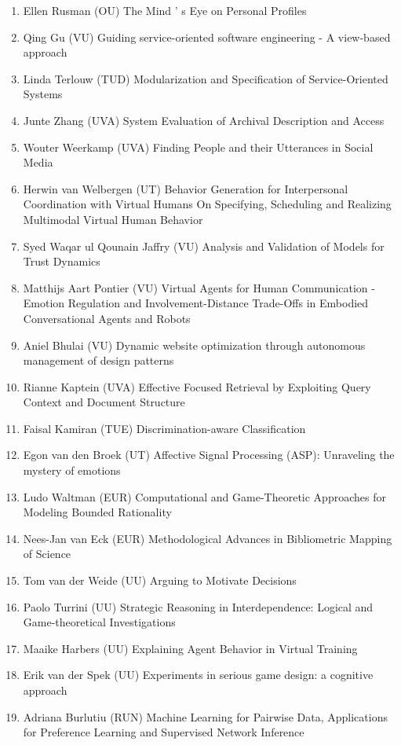 \begin{multicols}{2}
\begin{scriptsize}
\begin{enumerate}[leftmargin=*,noitemsep,topsep=0pt,parsep=1pt,partopsep=0pt]
\item Ellen Rusman (OU) The Mind ' s Eye on Personal Profiles
\item Qing Gu (VU) Guiding service-oriented software engineering - A view-based approach 
\item Linda Terlouw (TUD) Modularization and Specification of Service-Oriented Systems 
\item Junte Zhang (UVA) System Evaluation of Archival Description and Access 
\item Wouter Weerkamp (UVA) Finding People and their Utterances in Social Media 
\item Herwin van Welbergen (UT) Behavior Generation for Interpersonal Coordination with Virtual Humans On Specifying, Scheduling and Realizing Multimodal Virtual Human Behavior 
\item Syed Waqar ul Qounain Jaffry (VU) Analysis and Validation of Models for Trust Dynamics
\item Matthijs Aart Pontier (VU) Virtual Agents for Human Communication - Emotion Regulation and Involvement-Distance Trade-Offs in Embodied Conversational Agents and Robots 
\item Aniel Bhulai (VU) Dynamic website optimization through autonomous management of design patterns
\item Rianne Kaptein (UVA) Effective Focused Retrieval by Exploiting Query Context and Document Structure 
\item Faisal Kamiran (TUE) Discrimination-aware Classification
\item Egon van den Broek (UT) Affective Signal Processing (ASP): Unraveling the mystery of emotions 
\item Ludo Waltman (EUR) Computational and Game-Theoretic Approaches for Modeling Bounded Rationality
\item Nees-Jan van Eck (EUR) Methodological Advances in Bibliometric Mapping of Science
\item Tom van der Weide (UU) Arguing to Motivate Decisions
\item Paolo Turrini (UU) Strategic Reasoning in Interdependence: Logical and Game-theoretical Investigations 
\item Maaike Harbers (UU) Explaining Agent Behavior in Virtual Training 
\item Erik van der Spek (UU) Experiments in serious game design: a cognitive approach 
\item Adriana Burlutiu (RUN) Machine Learning for Pairwise Data, Applications for Preference Learning and Supervised Network Inference 

\end{enumerate}
\end{scriptsize}
\end{multicols}
